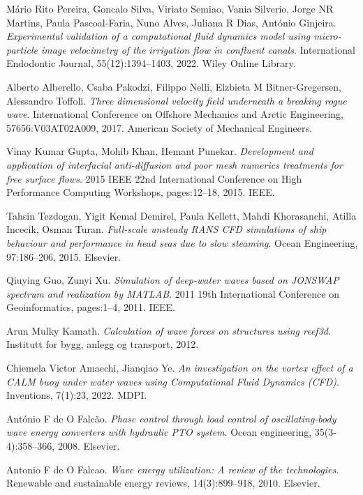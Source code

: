 \documentclass{article}
\begin{document}
\begin{thebibliography}{99}
Mário Rito Pereira, Goncalo Silva, Viriato Semiao, Vania Silverio, Jorge NR Martins, Paula Pascoal-Faria, Nuno Alves, Juliana R Dias, António Ginjeira.
\textit{Experimental validation of a computational fluid dynamics model using micro-particle image velocimetry of the irrigation flow in confluent canals}.
International Endodontic Journal, 55(12):1394--1403, 2022.
Wiley Online Library.

Alberto Alberello, Csaba Pakodzi, Filippo Nelli, Elzbieta M Bitner-Gregersen, Alessandro Toffoli.
\textit{Three dimensional velocity field underneath a breaking rogue wave}.
International Conference on Offshore Mechanics and Arctic Engineering, 57656:V03AT02A009, 2017.
American Society of Mechanical Engineers.

Vinay Kumar Gupta, Mohib Khan, Hemant Punekar.
\textit{Development and application of interfacial anti-diffusion and poor mesh numerics treatments for free surface flows}.
2015 IEEE 22nd International Conference on High Performance Computing Workshops, pages:12--18, 2015.
IEEE.

Tahsin Tezdogan, Yigit Kemal Demirel, Paula Kellett, Mahdi Khorasanchi, Atilla Incecik, Osman Turan.
\textit{Full-scale unsteady RANS CFD simulations of ship behaviour and performance in head seas due to slow steaming}.
Ocean Engineering, 97:186--206, 2015.
Elsevier.

Qiuying Guo, Zunyi Xu.
\textit{Simulation of deep-water waves based on JONSWAP spectrum and realization by MATLAB}.
2011 19th International Conference on Geoinformatics, pages:1--4, 2011.
IEEE.

Arun Mulky Kamath.
\textit{Calculation of wave forces on structures using reef3d}.
Institutt for bygg, anlegg og transport, 2012.

Chiemela Victor Amaechi, Jianqiao Ye.
\textit{An investigation on the vortex effect of a CALM buoy under water waves using Computational Fluid Dynamics (CFD)}.
Inventions, 7(1):23, 2022.
MDPI.

António F de O Falcão.
\textit{Phase control through load control of oscillating-body wave energy converters with hydraulic PTO system}.
Ocean engineering, 35(3-4):358--366, 2008.
Elsevier.

Antonio F de O Falcao.
\textit{Wave energy utilization: A review of the technologies}.
Renewable and sustainable energy reviews, 14(3):899--918, 2010.
Elsevier.


\end{thebibliography}
\end{document}
